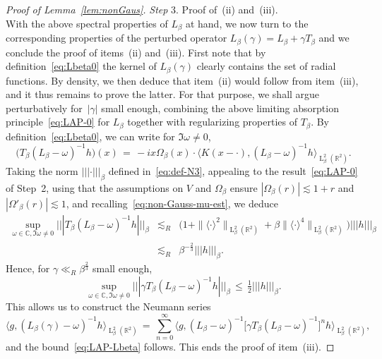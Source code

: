 \documentclass[a4paper,11pt,reqno,noindent]{amsart}
\theoremstyle{plain}
\numberwithin{equation}{section}
\newcommand{\R}{\mathbb R}
\newcommand{\C}{\mathbb C}
\newcommand{\3}{|\!|\!|}
\newcommand{\Ld}{\operatorname{L}}
\newcommand{\step}[1]{\noindent \textit{Step} #1.}
\begin{document}
\begin{proof}[Proof of Lemma~\ref{lem:nonGaus}]
\medskip
\step3 Proof of~(ii) and~(iii).\\
With the above spectral properties of $L_\beta$ at hand, we now turn to the corresponding properties of the perturbed operator $L_\beta(\gamma)=L_\beta+\gamma T_\beta$ and we conclude the proof of items~(ii) and~(iii).
First note that by definition~\eqref{eq:Lbeta0} the kernel of $L_\beta(\gamma)$ clearly contains the set of radial functions.
By density, we then deduce that item~(ii) would follow from item~(iii), and it thus remains to prove the latter.
For that purpose, we shall argue perturbatively for~$|\gamma|$ small enough, combining the above limiting absorption principle~\eqref{eq:LAP-0} for $L_\beta$ together with regularizing properties of $T_\beta$. By definition~\eqref{eq:Lbeta0}, we can write for $\Im\omega\ne0$,
\begin{equation*}
\big(T_\beta(L_\beta-\omega)^{-1}h\big)(x)\,=\,-i x\Omega_\beta(x)\cdot\big\langle K(x-\cdot),(L_\beta-\omega)^{-1}h\big\rangle_{\Ld^2_\beta(\R^2)}.
\end{equation*}
Taking the norm $\3\cdot\3_\beta$ defined in~\eqref{eq:def-N3},
appealing to the result~\eqref{eq:LAP-0} of Step~2,
{using that the assumptions on $V$ and $\Omega_\beta$ ensure $|\Omega_\beta(r)|\lesssim1+r$ and $|\Omega'_\beta(r)|\lesssim1$, and recalling~\eqref{eq:non-Gauss-mu-est},}
we deduce
\begin{eqnarray*}
\sup_{\omega\in\C,\Im\omega\ne0}\3 T_\beta(L_\beta-\omega)^{-1}h\3_\beta
&\lesssim_R&\big(1+\|\langle \cdot\rangle^2\|_{\Ld^2_\beta(\R^2)}+\beta\|\langle \cdot\rangle^4\|_{\Ld^2_\beta(\R^2)}\big)\3h\3_\beta\\
&\lesssim_R&\beta^{-\frac23}\3h\3_\beta.
\end{eqnarray*}
Hence, for $\gamma\ll_R\beta^{\frac23}$ small enough,
\[\sup_{\omega\in\C,\Im \omega\ne0}\3\gamma T_\beta(L_\beta-\omega)^{-1}h\3_\beta\,\le\,\tfrac12\3h\3_\beta.\]
This allows us to construct the Neumann series
\begin{equation}\label{eq:Neumann/Lresolv}
\big\langle g,(L_\beta(\gamma)-\omega)^{-1}h\big\rangle_{\Ld^2_\beta(\R^2)}\,=\,\sum_{n=0}^\infty\big\langle g,(L_\beta-\omega)^{-1}\big[\gamma T_\beta (L_\beta-\omega)^{-1}\big]^nh\big\rangle_{\Ld^2_\beta(\R^2)},
\end{equation}
and the bound~\eqref{eq:LAP-Lbeta} follows.
This ends the proof of item~(iii).
\end{proof}
\end{document}
